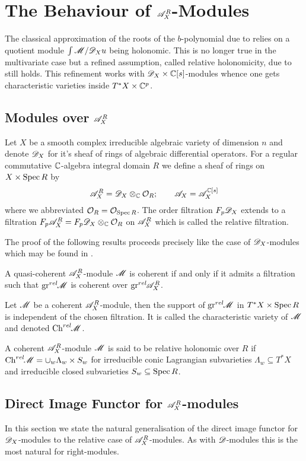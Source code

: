 \chapter{The Behaviour of $\mathscr{A}_X^R$-Modules}
The classical approximation of the roots of the $b$-polynomial due to \cite{kashiwara1976b} relies on a quotient module $\int \mathscr{M} / \mathscr{D}_X u$ being holonomic.
This is no longer true in the multivariate case but a refined assumption, called relative holonomicity, due to \cite{maisonobe2016filtration} still holds.
This refinement works with $\mathscr{D}_X\times\mathbb{C}[s]$-modules whence one gets characteristic varieties inside $T^*X \times \mathbb{C}^p$.

\section{Modules over $\mathscr{A}_X^R$}
Let $X$ be a smooth complex irreducible algebraic variety of dimension $n$ and denote $\mathscr{D}_X$ for it's sheaf of rings of algebraic differential operators.
For a regular commutative $\mathbb{C}$-algebra integral domain $R$ we define a sheaf of rings on $X\times \operatorname{Spec} R$ by
$$\mathscr{A}_{X}^R = \mathscr{D}_X \otimes_{\mathbb{C}} \mathcal{O}_{R}; \qquad \mathscr{A}_X = \mathscr{A}_{X}^{\mathbb{C}[s]}$$
where we abbreviated $\mathcal{O}_R = \mathcal{O}_{\operatorname{Spec} R}$.
The order filtration $F_p\mathscr{D}_X$ extends to a filtration $F_p\mathscr{A}^R_X = F_p\mathscr{D}_X \otimes_{\mathbb{C}} \mathcal{O}_R$ on $\mathscr{A}^R_X$ which is called the relative filtration.

The proof of the following results proceeds precisely like the case of $\mathscr{D}_X$-modules which may be found in \cite[Chapter 2]{hotta2007d}.
\begin{proposition}
    A quasi-coherent $\mathscr{A}_X^R$-module $\mathscr{M}$ is coherent if and only if it admits a filtration such that $\operatorname{gr}^{rel}\mkern-5mu \mathscr{M}$ is coherent over $\operatorname{gr}^{rel}\mkern-5mu \mathscr{A}_X^R$.
\end{proposition}
\begin{proposition}
    Let $\mathscr{M}$ be a coherent $\mathscr{A}_X^R$-module, then the support of $\operatorname{gr}^{rel}\mkern-5mu \mathscr{M}$ in $T^*X \times \operatorname{Spec} R$ is independent of the chosen filtration. It is called the characteristic variety of $\mathscr{M}$ and denoted $\operatorname{Ch}^{rel}\mkern-5mu \mathscr{M}$.
\end{proposition}

A coherent $\mathscr{A}_X^R$-module $\mathscr{M}$ is said to be relative holonomic over $R$ if $\operatorname{Ch}^{rel}\mkern-5mu \mathscr{M} = \cup_w \Lambda_w \times S_w$
for irreducible conic Lagrangian subvarieties $\Lambda_w\subseteq T^*X$ and irreducible closed subvarieties $S_w\subseteq \operatorname{Spec} R$.
\section{Direct Image Functor for $\mathscr{A}_X^R$-modules}
    In this section we state the natural generalisation of the direct image functor for $\mathscr{D}_X$-modules to the relative case of $\mathscr{A}_X^R$-modules. As with $\mathscr{D}$-modules this is the most natural for right-modules.

